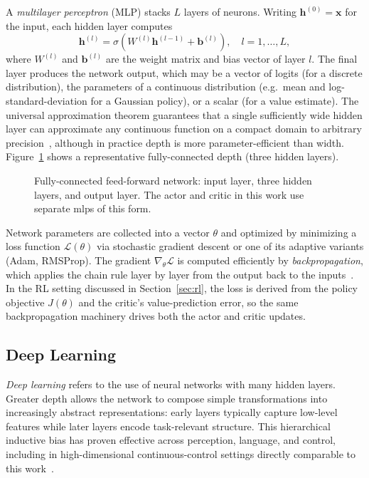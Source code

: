 A \emph{multilayer perceptron} (MLP) stacks $L$ layers of neurons.  Writing
$\mathbf{h}^{(0)} = \mathbf{x}$ for the input, each hidden layer computes
%
\begin{equation}
    \mathbf{h}^{(l)} = \sigma\!\left(W^{(l)}\mathbf{h}^{(l-1)} + \mathbf{b}^{(l)}\right),
    \quad l = 1, \ldots, L,
\end{equation}
%
where $W^{(l)}$ and $\mathbf{b}^{(l)}$ are the weight matrix and bias vector
of layer $l$.  The final layer produces the network output, which may be a
vector of logits (for a discrete distribution), the parameters of a
continuous distribution (e.g.\ mean and log-standard-deviation for a Gaussian
policy), or a scalar (for a value estimate).  The universal approximation
theorem guarantees that a single sufficiently wide hidden layer can approximate
any continuous function on a compact domain to arbitrary precision~\cite{goodfellow2016deep},
although in practice depth is more parameter-efficient than width.
Figure~\ref{fig:mlp} shows a representative fully-connected depth (three
hidden layers).

\begin{figure}[ht]
    \centering
    \resizebox{0.88\linewidth}{!}{%
    }
    \caption{Fully-connected feed-forward network: input layer, three hidden
    layers, and output layer.  The actor and critic in this work use separate
    \glspl{mlp} of this form.}
    \label{fig:mlp}
\end{figure}

Network parameters are collected into a vector $\theta$ and optimized by
minimizing a loss function $\mathcal{L}(\theta)$ via stochastic gradient
descent or one of its adaptive variants (Adam, RMSProp).  The gradient
$\nabla_\theta \mathcal{L}$ is computed efficiently by
\emph{backpropagation}, which applies the chain rule layer by layer from the
output back to the inputs~\cite{goodfellow2016deep}.  In the RL setting
discussed in Section~\ref{sec:rl}, the loss is derived from the policy
objective $J(\theta)$ and the critic's value-prediction error, so the same
backpropagation machinery drives both the actor and critic updates.

\subsection{Deep Learning}

\emph{Deep learning} refers to the use of neural networks with many hidden
layers.  Greater depth allows the network to compose simple transformations
into increasingly abstract representations: early layers typically capture
low-level features while later layers encode task-relevant structure.  This
hierarchical inductive bias has proven effective across perception, language,
and control, including in high-dimensional continuous-control settings
directly comparable to this work~\cite{silver2016mastering,berner2019dota}.

